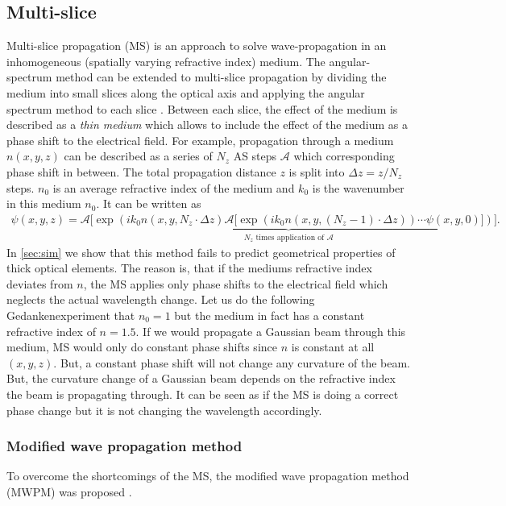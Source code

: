 \documentclass[a4paper,12pt]{article}
\begin{document}
\subsection{Multi-slice}
Multi-slice propagation (MS) is an approach to solve wave-propagation in an inhomogeneous (spatially varying refractive index) medium. 
The angular-spectrum method can be extended to multi-slice propagation by dividing the medium into small slices along the optical axis and applying the angular spectrum method to each slice \cite{https://doi.org/10.1107/S0365110X57002194,Li_Wojcik_Jacobsen_2017}. Between each slice, the effect of the medium is 
described as a \textit{thin medium} which allows to include the effect of the medium as a phase shift to the electrical field.
For example, propagation through a medium $n(x,y,z)$ can be described as a series of $N_z$ AS steps $\mathcal{A}$ which corresponding phase shift in between.
The total propagation distance $z$ is split into $\Delta z = z / N_z$ steps.
$n_0$ is an average refractive index of the medium and $k_0$ is the wavenumber in this medium $n_0$. It can be written as
\begin{align}
    \psi(x,y,z) = \underbrace{\mathcal{A}\bigg[\exp\left(i k_0 n(x,y, N_z \cdot \Delta z)\mathcal{A}\big[\exp\left(i k_0 n(x,y, (N_z - 1) \cdot \Delta z) \right) \cdots \psi(x,y, 0) \big] \right) \bigg]}_{N_z \text{ times application of }\mathcal{A}}. 
\end{align}
In \autoref{sec:sim} we show that this method fails to predict geometrical properties of thick optical elements.
The reason is, that if the mediums refractive index deviates from $n$, the MS applies only phase shifts to the electrical field which neglects the actual wavelength change.
Let us do the following Gedankenexperiment that $n_0 = 1$ but the medium in fact has a constant refractive index of $n=1.5$. If we would
propagate a Gaussian beam through this medium, MS would only do constant phase shifts since $n$ is constant at all $(x,y,z)$. But, a constant phase shift will not change any curvature of the beam. But, the curvature change of a Gaussian beam depends on the refractive index the beam is propagating through. It can be seen as if the MS is doing a correct phase change but it is not changing the wavelength accordingly. 

\subsubsection{Modified wave propagation method}
To overcome the shortcomings of the MS, the modified wave propagation method (MWPM) was proposed \cite{schmidt2016wave}.
\end{document}

